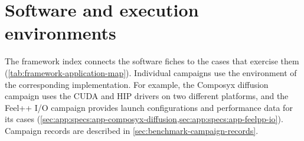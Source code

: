 \section{Software and execution environments}
\label{sec:apps-framework}

The framework index connects the software fiches to the cases that
exercise them (\cref{tab:framework-application-map}). Individual
campaigns use the environment of the corresponding implementation.
For example, the Composyx diffusion campaign uses the CUDA and HIP
drivers on two different platforms, and the Feel++ I/O campaign
provides launch configurations and performance data for its cases
(\cref{sec:app:specs:app-composyx-diffusion,sec:app:specs:app-feelpp-io}).
Campaign records are described in
\cref{sec:benchmark-campaign-records}.
